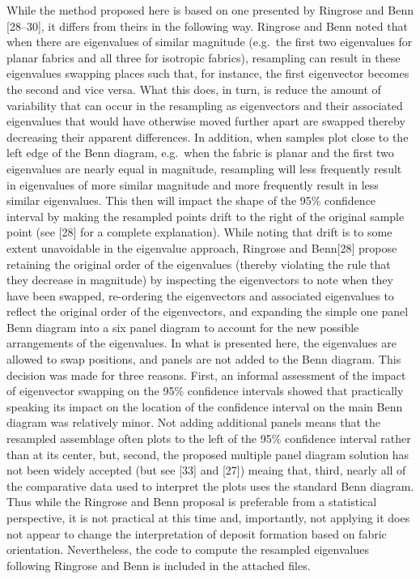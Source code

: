\documentclass[]{article}
\begin{document}
While the method proposed here is based on one presented by Ringrose and
Benn {[}28--30{]}, it differs from theirs in the following way. Ringrose
and Benn noted that when there are eigenvalues of similar magnitude
(e.g.~the first two eigenvalues for planar fabrics and all three for
isotropic fabrics), resampling can result in these eigenvalues swapping
places such that, for instance, the first eigenvector becomes the second
and vice versa. What this does, in turn, is reduce the amount of
variability that can occur in the resampling as eigenvectors and their
associated eigenvalues that would have otherwise moved further apart are
swapped thereby decreasing their apparent differences. In addition, when
samples plot close to the left edge of the Benn diagram, e.g.~when the
fabric is planar and the first two eigenvalues are nearly equal in
magnitude, resampling will less frequently result in eigenvalues of more
similar magnitude and more frequently result in less similar
eigenvalues. This then will impact the shape of the 95\% confidence
interval by making the resampled points drift to the right of the
original sample point (see {[}28{]} for a complete explanation). While
noting that drift is to some extent unavoidable in the eigenvalue
approach, Ringrose and Benn{[}28{]} propose retaining the original order
of the eigenvalues (thereby violating the rule that they decrease in
magnitude) by inspecting the eigenvectors to note when they have been
swapped, re-ordering the eigenvectors and associated eigenvalues to
reflect the original order of the eigenvectors, and expanding the simple
one panel Benn diagram into a six panel diagram to account for the new
possible arrangements of the eigenvalues. In what is presented here, the
eigenvalues are allowed to swap positions, and panels are not added to
the Benn diagram. This decision was made for three reasons. First, an
informal assessment of the impact of eigenvector swapping on the 95\%
confidence intervals showed that practically speaking its impact on the
location of the confidence interval on the main Benn diagram was
relatively minor. Not adding additional panels means that the resampled
assemblage often plots to the left of the 95\% confidence interval
rather than at its center, but, second, the proposed multiple panel
diagram solution has not been widely accepted (but see {[}33{]} and
{[}27{]}) meaing that, third, nearly all of the comparative data used to
interpret the plots uses the standard Benn diagram. Thus while the
Ringrose and Benn proposal is preferable from a statistical perspective,
it is not practical at this time and, importantly, not applying it does
not appear to change the interpretation of deposit formation based on
fabric orientation. Nevertheless, the code to compute the resampled
eigenvalues following Ringrose and Benn is included in the attached
files.
\end{document}
